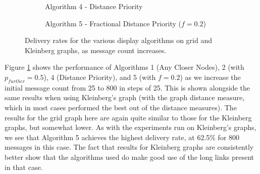 \documentclass[bsc,frontabs,twoside,singlespacing,parskip,deptreport]{infthesis}     %
\begin{document}
\begin{figure}
%
\par\bigskip 
%
\begin{subfigure}[t]{0.40\textwidth}
\captionsetup{justification=centering}
\caption{Algorithm 4 - Distance Priority}
\end{subfigure}
%
\begin{subfigure}[t]{0.40\textwidth}
\captionsetup{justification=centering}
\caption{Algorithm 5 - Fractional Distance Priority ($f=0.2$)}
\end{subfigure}
\caption{Delivery rates for the various display algorithms on grid and Kleinberg graphs, as message count increases. }
\label{fig:grid_show_models}
\end{figure}

Figure \ref{fig:grid_show_models} shows the performance of Algorithms 1 (Any Closer Nodes), 2 (with $p_{further}=0.5$), 4 (Distance Priority), and 5 (with $f=0.2$) as we increase the initial message count from 25 to 800 in steps of 25. This is shown alongside the same results when using Kleinberg's graph (with the graph distance measure, which in most cases performed the best out of the distance measures). The results for the grid graph here are again quite similar to those for the Kleinberg graphs, but somewhat lower. As with the experiments run on Kleinberg's graphs, we see that Algorithm 5 achieves the highest delivery rate, at 62.5\% for 800 messages in this case. The fact that results for Kleinberg graphs are consistently better show that the algorithms used do make good use of the long links present in that case.
\end{document}
